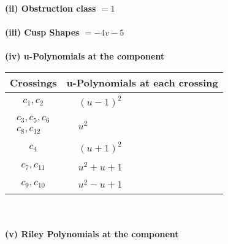 \documentclass[1p]{elsarticle_modified}
\theoremstyle{definition}
\begin{document}
\flushleft \textbf{(ii) Obstruction class $= 1$}\\~\\
\flushleft \textbf{(iii) Cusp Shapes $= -4 v-5$}\\~\\
\newpage\renewcommand{\arraystretch}{1}
\flushleft \textbf{(iv) u-Polynomials at the component}\newline \\
\begin{tabular}{m{50pt}|m{274pt}}
Crossings & \hspace{64pt}u-Polynomials at each crossing \\
\hline $$\begin{aligned}c_{1},c_{2}\end{aligned}$$&$\begin{aligned}
&(u-1)^2
\end{aligned}$\\
\hline $$\begin{aligned}c_{3},c_{5},c_{6}\\c_{8},c_{12}\end{aligned}$$&$\begin{aligned}
&u^2
\end{aligned}$\\
\hline $$\begin{aligned}c_{4}\end{aligned}$$&$\begin{aligned}
&(u+1)^2
\end{aligned}$\\
\hline $$\begin{aligned}c_{7},c_{11}\end{aligned}$$&$\begin{aligned}
&u^2+u+1
\end{aligned}$\\
\hline $$\begin{aligned}c_{9},c_{10}\end{aligned}$$&$\begin{aligned}
&u^2- u+1
\end{aligned}$\\
\hline
\end{tabular}\\~\\
\newpage\renewcommand{\arraystretch}{1}
\flushleft \textbf{(v) Riley Polynomials at the component}\newline \\
\end{document}
